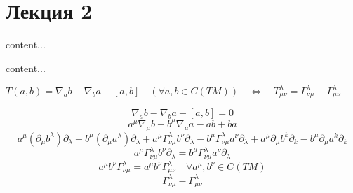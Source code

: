 \section{Лекция 2}

\begin{problem}
	content...
\end{problem}

\begin{problem}
	content...
\end{problem}




\begin{problem}
	$T(a, b)=\nabla_{a} b-\nabla_{b} a-[a, b] \quad(\forall a, b \in C(T M)) \quad \Leftrightarrow \quad T_{\mu \nu}^{\lambda}=\Gamma_{\nu \mu}^{\lambda}-\Gamma_{\mu \nu}^{\lambda}$
\end{problem}	

\begin{solution}
	$$\nabla_{a} b-\nabla_{b} a-[a, b]=0$$
	$$
	a^{\mu} \nabla_{\mu} b-b^{\mu} \nabla_{\mu} a-a b+b a
	$$
	$$
	a^{\mu}\left(\partial_{\mu} b^{\lambda}\right) \partial_{\lambda} 
	- b^{\mu}\left(\partial_{\mu} a^{\lambda}\right) \partial_{\lambda}
	+ 
	a^{\mu} \Gamma_{\nu \mu}^{\lambda} b^{\nu} \partial_{\lambda}
	-	b^{\mu} \Gamma_{\nu \mu}^{\lambda} a^{\nu} \partial_{\lambda}
	+a^{\mu}\partial_{\mu} b^{k}\partial_{k}-
	b^{\mu}\partial_{\mu} a^{k}\partial_{k}
	$$
	$$
	a^{\mu} \Gamma_{\nu \mu}^{\lambda} b^{\nu} \partial_{\lambda}=b^{\mu} \Gamma_{\nu \mu}^{\lambda} a^{\nu} \partial_{\lambda}
	$$
	$$
	a^{\mu} b^{\nu} \Gamma_{\nu \mu}^{\lambda}=a^{\mu} b^{\nu} \Gamma_{\mu \nu}^{\lambda} \quad \forall a^{\mu}, b^{\nu}  \in	C(T M)
	$$
	$$
	\boxed{\Gamma_{\nu \mu}^{\lambda}-\Gamma_{\mu \nu}^{\lambda}}
	$$
	
	
	
\end{solution}

